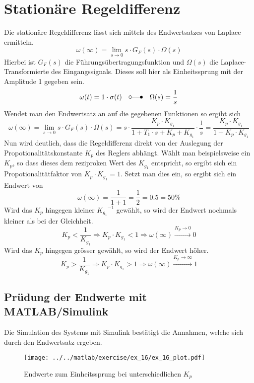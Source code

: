 \section{Stationäre Regeldifferenz}
Die stationäre Regeldifferenz lässt sich mittels des Endwertsatzes von
Laplace ermitteln.
\[
	\omega(\infty)
	= \lim_{s \rightarrow 0} s \cdot G_F(s) \cdot \Omega(s)	
\]
Hierbei ist $G_F(s)$ die Führungsübertragungsfunktion und $\Omega(s)$ die
Laplace-Transformierte des Eingangssignals. Dieses soll hier als
Einheitssprung mit der Amplitude 1 gegeben sein.
\[
	\omega(t)
	= 1 \cdot \sigma(t) \quad \laplace \quad \Omega(s) = \frac{1}{s}
\]
Wendet man den Endwertsatz an auf die gegebenen Funktionen so ergibt sich
\[
	\omega(\infty)
	= \lim_{s \rightarrow 0} s \cdot G_F(s) \cdot \Omega(s)	
	= s \cdot \frac{
		K_p \cdot K_{g_1}
	}{
		1 + T_1 \cdot s + K_p + K_{g_1}
	} \cdot \frac{1}{s}
	= \frac{K_p \cdot K_{g_1}}{1 + K_p \cdot K_{g_1}}
\]
Nun wird deutlich, dass die Regeldifferenz direkt von der Auslegung der
Propotionalitätskonstante $K_p$ des Reglers abhängt. Wählt man beispielsweise
ein $K_p$, so dass dieses dem reziproken Wert des $K_{g_1}$ entspricht, so
ergibt sich ein Propotionalitätfaktor von $K_p \cdot K_{g_1} = 1$. Setzt man
dies ein, so ergibt sich ein Endwert von 
\[
	\omega(\infty) = \frac{1}{1+1} = \frac{1}{2} = 0.5 = 50\%	
\]
Wird das $K_p$ hingegen kleiner ${K_{g_1}}^{-1}$ gewählt, so wird der Endwert
nochmals kleiner als bei der Gleichheit.
\[
	K_p < \frac{1}{K_{g_1}}
	\Rightarrow K_p \cdot K_{g_1} < 1 
		\Rightarrow \omega(\infty) \xrightarrow{K_p \rightarrow 0} 0
\]
Wird das $K_p$ hingegen grösser gewählt, so wird der Endwert höher.
\[
	K_p > \frac{1}{K_{g_1}}
	\Rightarrow K_p \cdot K_{g_1} > 1
		\Rightarrow \omega(\infty) \xrightarrow{K_p \rightarrow \infty} 1
\]

\subsection{Prüdung der Endwerte mit MATLAB/Simulink}
Die Simulation des Systems mit Simulink bestätigt die Annahmen, welche sich
durch den Endwertsatz ergeben.

\begin{figure}[h!]
	\centering
	\texttt{[image: ../../matlab/exercise/ex\_16/ex\_16\_plot.pdf]}
	\caption{Endwerte zum Einheitssprung bei unterschiedlichen $K_p$}
\end{figure}
